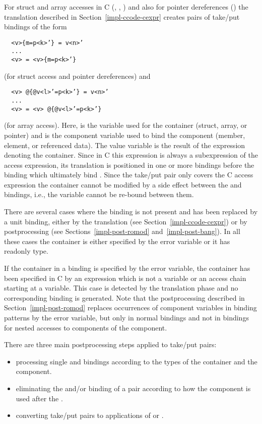 For struct and array accesses in C (, , ) and also for pointer dereferences ()
the translation described in Section~\ref{impl-ccode-cexpr} creates pairs of take/put bindings of the form
\begin{verbatim}
  <v>{m=p<k>’} = v<n>’
  ...
  <v> = <v>{m=p<k>’}
\end{verbatim}
(for struct access and pointer dereferences) and
\begin{verbatim}
  <v> @{@v<l>’=p<k>’} = v<n>’
  ...
  <v> = <v> @{@v<l>’=p<k>’}
\end{verbatim}
(for array access). Here,  is the variable used for the container (struct, array, or pointer) and  is the
component variable used to bind the component (member, element, or referenced data). The value variable  is the result
of the expression denoting the container. Since in C this expression is always a subexpression of the access expression, its
translation is positioned in one or more bindings before the  binding which ultimately bind .
Since the take/put pair only covers the C access expression the container cannot be modified by a side effect between the
 and  bindings, i.e., the variable  cannot be re-bound between them.

There are several cases where the  binding is not present and has been replaced by a unit binding, either by the
translation (see Section~\ref{impl-ccode-cexpr}) or by postprocessing (see Sections~\ref{impl-post-romod} and~\ref{impl-post-bang}).
In all these cases the container is either specified by the error variable  or it has readonly type.

If the container in a  binding is specified by the error variable, the container has been specified in C by an expression
which is not a variable or an access chain starting at a variable. This case is detected by the translation phase and no corresponding
 binding is generated. Note that the postprocessing described in Section~\ref{impl-post-romod} replaces occurrences of
component variables in binding patterns by the error variable, but only in normal bindings and not in  bindings for nested
accesses to components of the component.

There are three main postprocessing steps applied to take/put pairs:
\begin{itemize}
\item processing single  and  bindings according to the types of the container and the component.
\item eliminating the  and/or  binding of a pair according to how the component is used after the .
\item converting take/put pairs to applications of  or .
\end{itemize}

